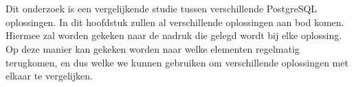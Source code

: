 \chapter{}
\label{ch:stand-van-zaken}

Dit onderzoek is een vergelijkende studie tussen verschillende PostgreSQL oplossingen. In dit hoofdstuk zullen al verschillende oplossingen aan bod komen. Hiermee zal worden gekeken naar de nadruk die gelegd wordt bij elke oplossing. Op deze manier kan gekeken worden naar welke elementen regelmatig terugkomen, en dus welke we kunnen gebruiken om verschillende oplossingen met elkaar te vergelijken.


\section{}
\label{sec:PosgreSQL}


